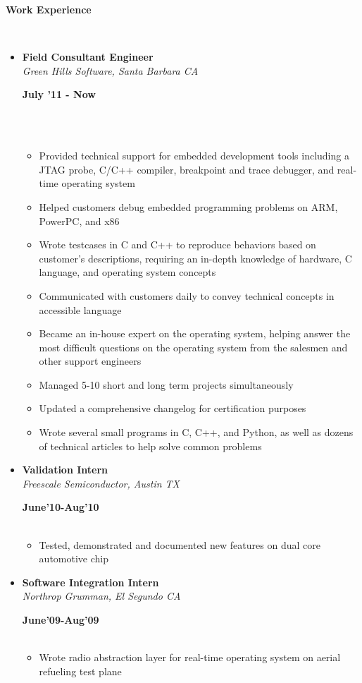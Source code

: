 \documentclass[a4paper,11pt]{article}
\newcommand{\isep}{-2 pt}
\newcommand{\lsep}{-0.2cm}
\newcommand{\resheading}[1]{{\small \colorbox{mygrey}{\begin{minipage}{0.975\textwidth}{\textbf{#1 \vphantom{p\^{E}}}}\end{minipage}}}}
\newcommand{\workexp}[4]{
\begin{minipage}[t]{7cm}
\begin{flushleft}
\textbf{#1} \\
\indent \emph{#2}\\
\end{flushleft}
\end{minipage}
\hfill
\begin{minipage}[t]{7cm}
\begin{flushright}
\textbf{#3} \\
\indent #4 \\
\end{flushright}
\end{minipage}
}
\begin{document}
\resheading{\textbf{Work Experience} }\\[\lsep]
\begin{itemize}
\item 
\workexp{Field Consultant Engineer}{Green Hills Software, Santa Barbara CA}{July '11 - Now}{}
\\[-0.2cm]
	\begin{itemize}\itemsep \isep
	\item Provided technical support for embedded development tools including a JTAG probe, C/C++ compiler, breakpoint and trace debugger, and real-time operating system
	\item Helped customers debug embedded programming problems on ARM, PowerPC, and x86
	\item Wrote testcases in C and C++ to reproduce behaviors based on customer's descriptions, requiring an in-depth knowledge of hardware, C language, and operating system concepts
	\item Communicated with customers daily to convey technical concepts in accessible language
	\item Became an in-house expert on the operating system, helping answer the most difficult questions on the operating system from the salesmen and other support engineers
	\item Managed 5-10 short and long term projects simultaneously
	\item Updated a comprehensive changelog for certification purposes
	\item Wrote several small programs in C, C++, and Python, as well as dozens of technical articles to help solve common problems
	\end{itemize}

\item
\workexp{Validation Intern}{Freescale Semiconductor, Austin TX}{June'10-Aug'10}{}
	\begin{itemize}\itemsep \isep
	\item Tested, demonstrated and documented new features on dual core automotive chip
	\end{itemize}
\item
\workexp{Software Integration Intern}{Northrop Grumman, El Segundo CA}{June'09-Aug'09}{}
	\begin{itemize}\itemsep \isep
	\item Wrote radio abstraction layer for real-time operating system on aerial refueling test plane
	\end{itemize}
\end{itemize}
\end{document}
